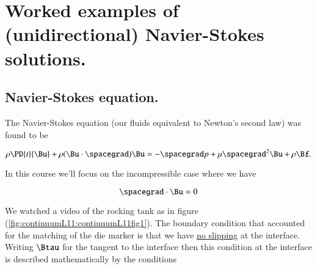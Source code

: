 %
%

\chapter{Worked examples of (unidirectional) Navier-Stokes solutions.}
\label{chap:continuumL11}
{}
\date{Feb 15, 2012}

\beginArtWithToc

%
%

\section{Navier-Stokes equation.}

The Navier-Stokes equation (our fluids equivalent to Newton's second law) was found to be

\begin{equation}\label{eqn:continuumL11:10}
\rho \PD{t}{\Bu} + \rho (\Bu \cdot \spacegrad) \Bu = - \spacegrad p + \mu \spacegrad^2 \Bu + \rho \Bf.
\end{equation}

In this course we'll focus on the incompressible case where we have

\begin{equation}\label{eqn:continuumL11:30}
\spacegrad \cdot \Bu = 0
\end{equation}

We watched a video of the rocking tank as in figure (\ref{fig:continuumL11:continuumL11fig1}).  The boundary condition that accounted for the matching of the die marker is that we have \underline{no slipping} at the interface.  Writing $\Btau$ for the tangent to the interface then this condition at the interface is described mathematically by the conditions

